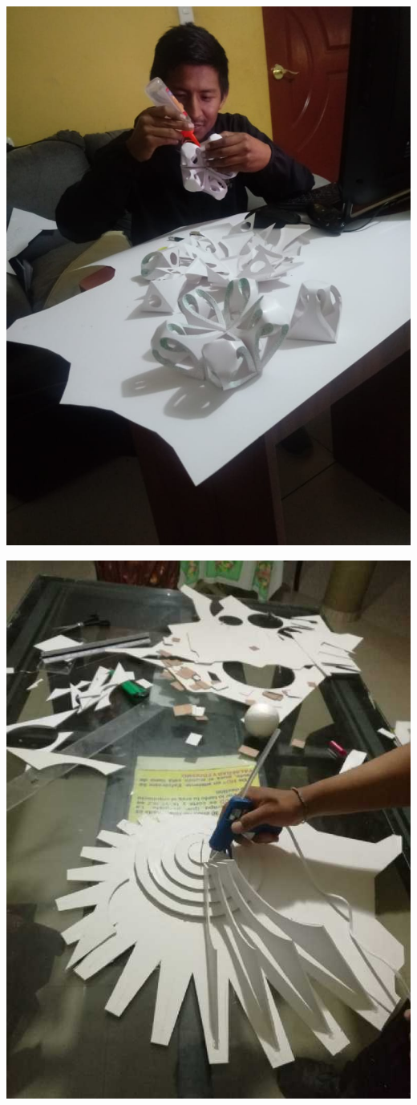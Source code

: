 \documentclass[12pt,]{report}
\begin{document}
\includegraphics{t5t.jpg}

\includegraphics{y2.jpg}
\end{document}
